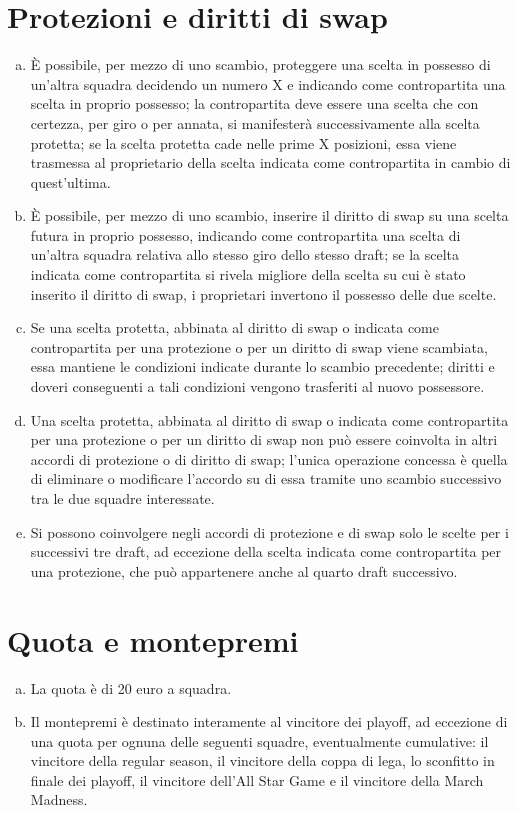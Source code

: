 \documentclass{article}
\begin{document}
\section{Protezioni e diritti di swap}\label{Protezioni e diritti di swap}
\begin{enumerate}[(a)]
\item È possibile, per mezzo di uno scambio, proteggere una scelta in possesso di un'altra squadra decidendo un numero X e indicando come contropartita una scelta in proprio possesso; la contropartita deve essere una scelta che con certezza, per giro o per annata, si manifesterà successivamente alla scelta protetta; se la scelta protetta cade nelle prime X posizioni, essa viene trasmessa al proprietario della scelta indicata come contropartita in cambio di quest'ultima.
\item È possibile, per mezzo di uno scambio, inserire il diritto di swap su una scelta futura in proprio possesso, indicando come contropartita una scelta di un'altra squadra relativa allo stesso giro dello stesso draft; se la scelta indicata come contropartita si rivela migliore della scelta su cui è stato inserito il diritto di swap, i proprietari invertono il possesso delle due scelte.
\item Se una scelta protetta, abbinata al diritto di swap o indicata come contropartita per una protezione o per un diritto di swap viene scambiata, essa mantiene le condizioni indicate durante lo scambio precedente; diritti e doveri conseguenti a tali condizioni vengono trasferiti al nuovo possessore.
\item Una scelta protetta, abbinata al diritto di swap o indicata come contropartita per una protezione o per un diritto di swap non può essere coinvolta in altri accordi di protezione o di diritto di swap; l'unica operazione concessa è quella di eliminare o modificare l'accordo su di essa tramite uno scambio successivo tra le due squadre interessate.
\item Si possono coinvolgere negli accordi di protezione e di swap solo le scelte per i successivi tre draft, ad eccezione della scelta indicata come contropartita per una protezione, che può appartenere anche al quarto draft successivo.
\end{enumerate}

\section{Quota e montepremi}\label{Quota e montepremi}
\begin{enumerate}[(a)]
\item La quota è di 20 euro a squadra.
\item Il montepremi è destinato interamente al vincitore dei playoff, ad eccezione di una quota per ognuna delle seguenti squadre, eventualmente cumulative: il vincitore della regular season, il vincitore della coppa di lega, lo sconfitto in finale dei playoff, il vincitore dell'All Star Game e il vincitore della March Madness.
\end{enumerate}
\end{document}
